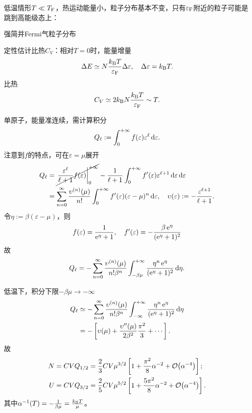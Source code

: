 低温情形$T\ll T_\mathrm F$，热运动能量小，粒子分布基本不变，只有$\varepsilon_\mathrm F$附近的粒子可能是跳到高能级态上：
\begin{center}
	\tikzchap 强简并Fermi气粒子分布
\end{center}
定性估计比热$C_V$：相对$T=0$时，能量增量
\[
	\Delta E\simeq N\frac{k_{\mathrm B} T}{\varepsilon_\mathrm F}\Delta\varepsilon,\quad\Delta\varepsilon=k_{\mathrm B} T.
\]
比热
\[
	C_V\simeq 2k_{\mathrm B} N\frac{k_{\mathrm B} T}{\varepsilon_\mathrm F}\sim T.
\]

单原子，能量准连续，需计算积分
\[
	Q_\ell:=\int_0^{+\infty} f(\varepsilon)\varepsilon^\ell\mathop{}\!\mathrm{d}\varepsilon.
\]
注意到$f$的特点，可在$\varepsilon=\mu$展开
\begin{align}\notag
	Q_\ell&=\cancel{\edg{\frac{\varepsilon^\ell}{\ell+1}f(\varepsilon)}\zti}-\frac1{\ell+1}\int\zti f'(\varepsilon)\varepsilon^{\ell+1}\d\varepsilon %
	\d\varepsilon\\
	&=\sum_{n=0}^\infty\frac{\upsilon^{(n)}(\mu)}{n!}\int\zti f'(\varepsilon)(\varepsilon-\mu)^n\d\varepsilon,\quad\upsilon(\varepsilon):=-\frac{\varepsilon^{\ell+1}}{\ell+1}.
\end{align}
令$\eta:=\beta(\varepsilon-\mu)$，则
\[
	f(\varepsilon)=\frac1{\mathop{}\!\mathrm{e}^\eta+1},\quad f'(\varepsilon)=-\frac{\beta\mathop{}\!\mathrm{e}^\eta}{(\mathop{}\!\mathrm{e}^\eta+1)^2}
\]
故
\[
	Q_\ell=-\sum_{n=0}^{\infty}\frac{\upsilon^{(n)}(\mu)}{n!\beta^n}\int_{-\beta\mu}^{+\infty}\frac{\eta^n\mathop{}\!\mathrm{e}^\eta}{(\mathop{}\!\mathrm{e}^\eta+1)^2}\mathop{}\!\mathrm{d}\eta.
\]

低温下，积分下限$-\beta\mu\to-\infty$
\begin{align*}
	Q_\ell&\simeq-\sum_{n=0}^{\infty}\frac{\upsilon^{(n)}(\mu)}{n!\beta^n}\int_{-\infty}^{+\infty}\frac{\eta^n\mathop{}\!\mathrm{e}^\eta}{(\mathop{}\!\mathrm{e}^\eta+1)^2}\mathop{}\!\mathrm{d}\eta\\
	&=-\left[\upsilon(\mu)+\frac{\upsilon''(\mu)}{2\beta^2}\frac{\pi^2}3+\cdots\right].
\end{align*}
故
\begin{align}
	N=CVQ_{1/2}&=\frac23CV\mu^{3/2}\left[1+\frac{\pi^2}8\alpha^{-2}+\mathcal O\!\left(\alpha^{-4}\right)\right];\\
	U=CVQ_{3/2}&=\frac25CV\mu^{5/2}\left[1+\frac{5\pi^2}8\alpha^{-2}+\mathcal O\!\left(\alpha^{-4}\right)\right].
\end{align}
其中$\alpha^{-1}(T)=-\frac1{\beta\mu}=\frac{k_{\mathrm B} T}{\mu}$。

